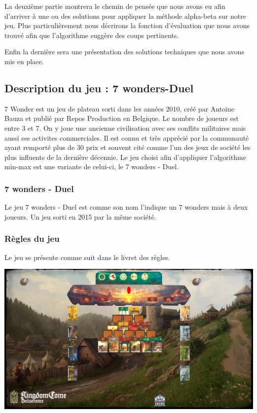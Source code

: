 \documentclass[a4paper, 12pt, french]{article}
\begin{document}
	La deuxième partie montrera le chemin de pensée que nous avons eu afin d'arriver à une ou des solutions pour
	appliquer la méthode alpha-beta sur notre jeu. Plus particulièrement nous décrirons la fonction d'évaluation
	que nous avons trouvé afin que l'algorithme suggère des coups pertinents.

	Enfin la dernière sera une présentation des solutions techniques que nous avons mis en place.

	\subsection{Description du jeu : 7 wonders-Duel}
	7 Wonder est un jeu de plateau sorti dans les années 2010, créé par Antoine Bauza et publié par Repos Production en
	Belgique. Le nombre de joueurs est entre 3 et 7. On y joue une ancienne
	civilisation avec ses conflits militaires mais aussi ses activites commerciales. Il est connu et très apprécié
	par la communauté ayant remporté plus de 30 prix et souvent cité comme l'un des jeux de société les plus influents
	de la dernière décennie\cite{wiki_7_wonder}.
	Le jeu choisi afin d'appliquer l'algorithme min-max est une variante de celui-ci, le 7 wonders - Duel.

	\subsubsection{7 wonders - Duel}
	Le jeu 7 wonders - Duel est comme son nom l'indique un 7 wonders mais à deux joueurs. Un jeu sorti en 2015
	par la même société.

	\subsubsection{Règles du jeu}
	Le jeu se présente comme suit dans le livret des règles\cite{regle_7_wonder_duel}.

	 \includegraphics[width=15cm]{images/PlateauDebut}
\end{document}
